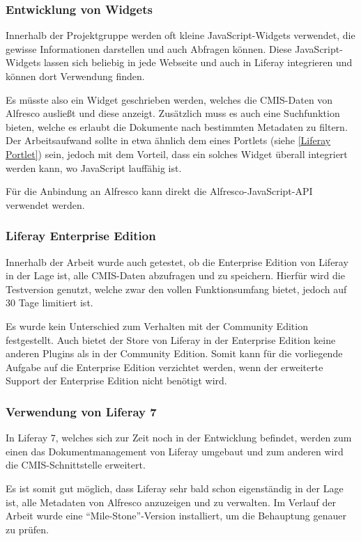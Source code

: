\subsubsection{Entwicklung von Widgets}\label{Liferay Widget}
Innerhalb der Projektgruppe werden oft kleine JavaScript-Widgets verwendet, die gewisse Informationen darstellen und auch Abfragen k\"onnen. 
Diese JavaScript-Widgets lassen sich beliebig in jede Webseite und auch in Liferay integrieren und k\"onnen dort Verwendung finden.

Es m\"usste also ein Widget geschrieben werden, welches die \ac{CMIS}-Daten von Alfresco auslie\ss{}t und diese anzeigt. Zus\"atzlich muss es auch eine Suchfunktion bieten, welche es erlaubt die Dokumente nach bestimmten Metadaten zu filtern. Der Arbeitsaufwand sollte in etwa \"ahnlich dem eines Portlets (siehe \ref{Liferay Portlet}) sein, jedoch mit dem Vorteil, dass ein solches Widget \"uberall integriert werden kann, wo JavaScript lauff\"ahig ist. 

F\"ur die Anbindung an Alfresco kann direkt die Alfresco-JavaScript-\ac{API} verwendet werden.

\subsubsection{Liferay Enterprise Edition}\label{Liferay EE}
Innerhalb der Arbeit wurde auch getestet, ob die Enterprise Edition von Liferay in der Lage ist, alle \ac{CMIS}-Daten abzufragen und zu speichern. Hierf\"ur wird die Testversion genutzt, welche zwar den vollen Funktionsumfang bietet, jedoch auf 30 Tage limitiert ist.

Es wurde kein Unterschied zum Verhalten mit der Community Edition festgestellt. Auch bietet der Store von Liferay in der Enterprise Edition keine anderen Plugins als in der Community Edition. Somit kann f\"ur die vorliegende Aufgabe auf die Enterprise Edition verzichtet werden, wenn der erweiterte Support der Enterprise Edition nicht ben\"otigt wird.

\subsubsection{Verwendung von Liferay 7}\label{Liferay 7}
In Liferay 7, welches sich zur Zeit noch in der Entwicklung befindet, werden zum einen das Dokumentmanagement von Liferay umgebaut und zum anderen wird die \ac{CMIS}-Schnittstelle erweitert. \cite{liferay7}

Es ist somit gut m\"oglich, dass Liferay sehr bald schon eigenst\"andig in der Lage ist, alle Metadaten von Alfresco anzuzeigen und zu verwalten.
Im Verlauf der Arbeit wurde eine "`Mile-Stone"'-Version installiert, um die Behauptung genauer zu pr\"ufen.


